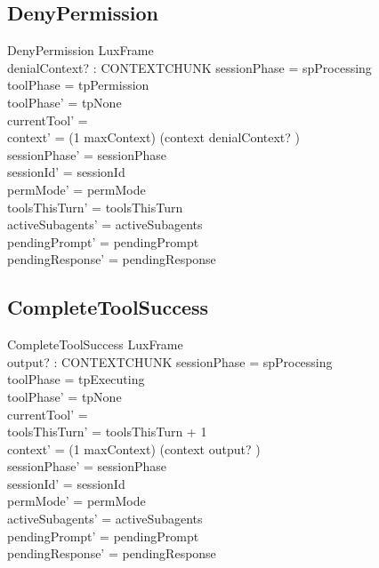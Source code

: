 \documentclass[a4paper,10pt,fleqn]{article}
\begin{document}
\subsection{DenyPermission}

\begin{schema}{DenyPermission}
  LuxFrame \\
  denialContext? : CONTEXTCHUNK
  \where
  sessionPhase = spProcessing \\
  toolPhase = tpPermission \\
  toolPhase' = tpNone \\
  currentTool' = \emptyset \\
  context' = (1 \upto maxContext) \dres (context \cat \langle denialContext? \rangle) \\
  sessionPhase' = sessionPhase \\
  sessionId' = sessionId \\
  permMode' = permMode \\
  toolsThisTurn' = toolsThisTurn \\
  activeSubagents' = activeSubagents \\
  pendingPrompt' = pendingPrompt \\
  pendingResponse' = pendingResponse
\end{schema}

\subsection{CompleteToolSuccess}

\begin{schema}{CompleteToolSuccess}
  LuxFrame \\
  output? : CONTEXTCHUNK
  \where
  sessionPhase = spProcessing \\
  toolPhase = tpExecuting \\
  toolPhase' = tpNone \\
  currentTool' = \emptyset \\
  toolsThisTurn' = toolsThisTurn + 1 \\
  context' = (1 \upto maxContext) \dres (context \cat \langle output? \rangle) \\
  sessionPhase' = sessionPhase \\
  sessionId' = sessionId \\
  permMode' = permMode \\
  activeSubagents' = activeSubagents \\
  pendingPrompt' = pendingPrompt \\
  pendingResponse' = pendingResponse
\end{schema}
\end{document}
